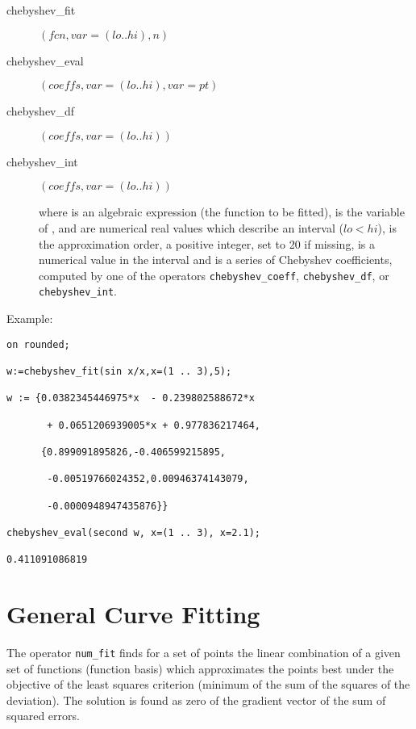 \begin{description}
\item[chebyshev\_fit] $(fcn,var=(lo .. hi),n)$

\item[chebyshev\_eval] $(coeffs,var=(lo .. hi),var=pt)$

\item[chebyshev\_df] $(coeffs,var=(lo .. hi))$

\item[chebyshev\_int] $(coeffs,var=(lo .. hi))$

where  is an algebraic expression (the function to be
fitted),  is the variable of ,  and  are
numerical real values which describe an interval ($lo < hi$),
 is the approximation order, a positive integer, set to 20 if missing,
 is a numerical value in the interval and  is
a series of Chebyshev coefficients, computed by one of the operators
\texttt{chebyshev\_coeff}, \texttt{chebyshev\_df}, or \texttt{chebyshev\_int}.
\end{description}

Example:

\begin{verbatim}
on rounded;

w:=chebyshev_fit(sin x/x,x=(1 .. 3),5);

w := {0.0382345446975*x  - 0.239802588672*x

       + 0.0651206939005*x + 0.977836217464,

      {0.899091895826,-0.406599215895,

       -0.00519766024352,0.00946374143079,

       -0.0000948947435876}}

chebyshev_eval(second w, x=(1 .. 3), x=2.1);

0.411091086819
\end{verbatim}

\section{General Curve Fitting}
\hypertarget{operator:NUM_FIT}{}

The operator \texttt{num\_fit} finds for a set of
points the linear combination of a given set of
functions (function basis) which approximates the
points best under the objective of the least squares
criterion (minimum of the sum of the squares of the deviation).
The solution is found as zero of the
gradient vector of the sum of squared errors.

